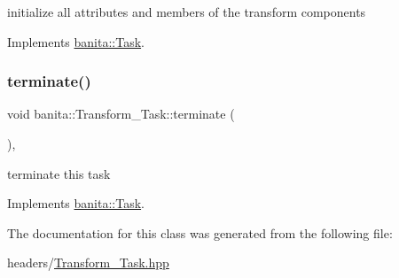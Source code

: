 initialize all attributes and members of the transform components 



Implements \mbox{\hyperlink{classbanita_1_1_task_a34578cdd41899a338ac09fec3a285487}{banita\+::\+Task}}.

\mbox{\label{classbanita_1_1_transform___task_a95d857713fec2b3bf90d64260be0a997}} 
\subsubsection{\texorpdfstring{terminate()}{terminate()}}
{\footnotesize\ttfamily void banita\+::\+Transform\+\_\+\+Task\+::terminate (\begin{DoxyParamCaption}{ }\end{DoxyParamCaption})\hspace{0.3cm}{\ttfamily [override]}, {\ttfamily [virtual]}}



terminate this task 



Implements \mbox{\hyperlink{classbanita_1_1_task_acccbd449402b1e9ce1ba34c26333a1b6}{banita\+::\+Task}}.



The documentation for this class was generated from the following file\+:\begin{DoxyCompactItemize}
\item 
headers/\mbox{\hyperlink{_transform___task_8hpp}{Transform\+\_\+\+Task.\+hpp}}\end{DoxyCompactItemize}
